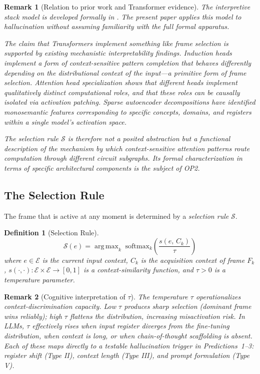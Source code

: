 \documentclass[12pt]{article}
\newtheorem{definition}{Definition}
\newtheorem{remark}{Remark}
\begin{document}
\begin{remark}[Relation to prior work and Transformer evidence]
The interpretive stack model is developed formally in
\cite{minamoto2026accumulation}. The present paper
applies this model to hallucination without assuming familiarity with
the full formal apparatus.

The claim that Transformers implement something like frame selection
is supported by existing mechanistic interpretability findings.
Induction heads \cite{olsson2022induction} implement a form of
context-sensitive pattern completion that behaves differently
depending on the distributional context of the input---a primitive
form of frame selection. Attention head specialization
\cite{elhage2021mathematical} shows that different heads implement
qualitatively distinct computational roles, and that these roles
can be causally isolated via activation patching. Sparse
autoencoder decompositions \cite{bricken2023monosemanticity} have
identified monosemantic features corresponding to specific concepts,
domains, and registers within a single model's activation space.

The selection rule $\mathcal{S}$ is therefore not a posited
abstraction but a functional description of the mechanism by which
context-sensitive attention patterns route computation through
different circuit subgraphs. Its formal characterization in terms
of specific architectural components is the subject of OP2.
\end{remark}

\subsection{The Selection Rule}
\label{sec:selection-rule}

The frame that is active at any moment is determined by a
\emph{selection rule} $\mathcal{S}$.

\begin{definition}[Selection Rule]
\[
\mathcal{S}(e)
  = \operatorname{arg\,max}_k\;
    \mathrm{softmax}_k\!\left(\frac{s(e,\, C_k)}{\tau}\right)
\]
where $e \in \mathcal{E}$ is the current input context,
$C_k$ is the acquisition context of frame $F_k$,
$s(\cdot,\cdot): \mathcal{E} \times \mathcal{E} \to [0,1]$ is a context-similarity function,
and $\tau > 0$ is a temperature parameter.
\end{definition}

\begin{remark}[Cognitive interpretation of $\tau$]
The temperature $\tau$ operationalizes context-discrimination capacity.
Low $\tau$ produces sharp selection (dominant frame wins reliably);
high $\tau$ flattens the distribution, increasing misactivation risk.
In LLMs, $\tau$ effectively rises when input register diverges from
the fine-tuning distribution, when context is long, or when
chain-of-thought scaffolding is absent.
Each of these maps directly to a testable hallucination trigger
in Predictions~1--3: register shift (Type II), context length
(Type III), and prompt formulation (Type V).
\end{remark}
\end{document}
